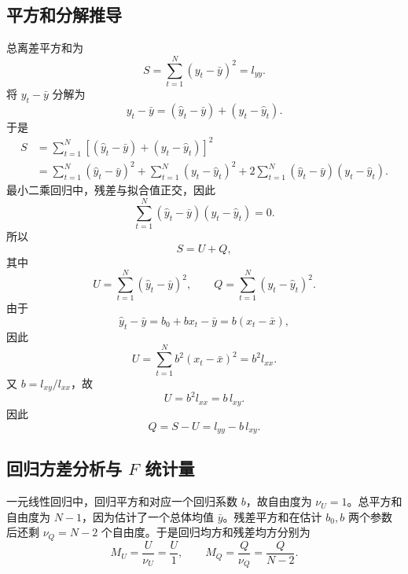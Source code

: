 \documentclass[UTF8,12pt,a4paper]{ctexart}
\begin{document}
\subsection{平方和分解推导}
总离差平方和为
\begin{equation*}
    S=\sum_{t=1}^{N}(y_t-\bar{y})^2=l_{yy} .
\end{equation*}
将 $y_t-\bar{y}$ 分解为
\begin{equation*}
    y_t-\bar{y}=(\hat{y}_t-\bar{y})+(y_t-\hat{y}_t) .
\end{equation*}
于是
\begin{equation*}
\begin{aligned}
    S
    &=\sum_{t=1}^{N}\left[(\hat{y}_t-\bar{y})+(y_t-\hat{y}_t)\right]^2 \\
    &=\sum_{t=1}^{N}(\hat{y}_t-\bar{y})^2
      +\sum_{t=1}^{N}(y_t-\hat{y}_t)^2
      +2\sum_{t=1}^{N}(\hat{y}_t-\bar{y})(y_t-\hat{y}_t) .
\end{aligned}
\end{equation*}
最小二乘回归中，残差与拟合值正交，因此
\begin{equation*}
    \sum_{t=1}^{N}(\hat{y}_t-\bar{y})(y_t-\hat{y}_t)=0 .
\end{equation*}
所以
\begin{equation*}
    S=U+Q,
\end{equation*}
其中
\begin{equation*}
    U=\sum_{t=1}^{N}(\hat{y}_t-\bar{y})^2,
    \qquad
    Q=\sum_{t=1}^{N}(y_t-\hat{y}_t)^2 .
\end{equation*}
由于
\begin{equation*}
    \hat{y}_t-\bar{y}=b_0+bx_t-\bar{y}=b(x_t-\bar{x}),
\end{equation*}
因此
\begin{equation*}
    U=\sum_{t=1}^{N}b^2(x_t-\bar{x})^2=b^2l_{xx} .
\end{equation*}
又 $b=l_{xy}/l_{xx}$，故
\begin{equation*}
    U=b^2l_{xx}=b\,l_{xy} .
\end{equation*}
因此
\begin{equation*}
    Q=S-U=l_{yy}-b\,l_{xy} .
\end{equation*}

\subsection{回归方差分析与 $F$ 统计量}
一元线性回归中，回归平方和对应一个回归系数 $b$，故自由度为 $\nu_U=1$。总平方和自由度为 $N-1$，因为估计了一个总体均值 $\bar{y}$。残差平方和在估计 $b_0,b$ 两个参数后还剩 $\nu_Q=N-2$ 个自由度。于是回归均方和残差均方分别为
\begin{equation*}
    M_U=\frac{U}{\nu_U}=\frac{U}{1},
    \qquad
    M_Q=\frac{Q}{\nu_Q}=\frac{Q}{N-2} .
\end{equation*}
\end{document}
